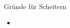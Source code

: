 

\begin{frame}[c]{Gründe für Scheitern}
    \begin{itemize}
        \item
    \end{itemize}
\end{frame}


